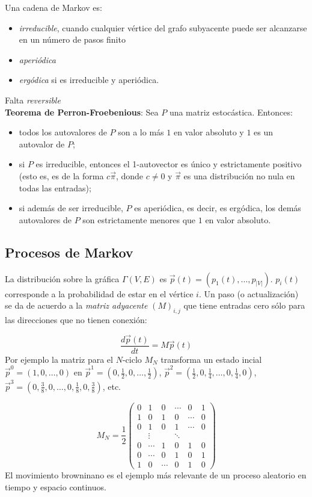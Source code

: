 \noindent Una cadena de Markov es:
\begin{itemize}
    \item \textit{irreducible}, cuando cualquier vértice del grafo subyacente puede ser alcanzarse en un número de pasos finito
    \item \textit{aperiódica}
    \item \textit{ergódica} si es irreducible y aperiódica.
\end{itemize}
Falta \textit{reversible}\\
\textbf{Teorema de Perron-Froebenious}: Sea $P$ una matriz estocástica. Entonces:
\begin{itemize}
    \item todos los autovalores de $P$ son a lo más $1$ en valor absoluto y $1$ es un autovalor de $P$;
    \item si $P$ es irreducible, entonces el 1-autovector es único y estrictamente positivo (esto es, es de la forma $c\vec{\pi}$, donde $c\neq 0$ y $\vec{\pi}$ es una distribución no nula en todas las entradas);
    \item si además de ser irreducible, $P$ es aperiódica, es decir, es ergódica, los demás autovalores de $P$ son estrictamente menores que $1$ en valor absoluto.
\end{itemize}

\subsection{Procesos de Markov\label{ProcesosMarkov}}
La distribución sobre la gráfica $\Gamma(V,E)$ es $\Vec{p}(t)=(p_1(t),\dots,p_{|V|})$. $p_i(t)$ corresponde a la probabilidad de estar en el vértice $i$. Un paso (o actualización) se da de acuerdo a la \textit{matriz adyacente} $(M)_{i,j}$ que tiene entradas cero sólo para las direcciones que no tienen conexión:

\begin{equation}
    \dfrac{d\Vec{p}(t)}{dt}=M\Vec{p}(t)
\end{equation}{}
Por ejemplo la matriz para el $N$-ciclo $M_N$ transforma un estado incial $\Vec{p}^0=(1,0,\dots,0)$ en $\Vec{p}^1=(0,\frac{1}{2},0,\dots,\frac{1}{2})$, $\Vec{p}^2=(\frac{1}{2},0,\frac{1}{4},\dots,0,\frac{1}{4},0)$, $\Vec{p}^3=(0,\frac{3}{8},0,\dots,0,\frac{1}{8},0,\frac{3}{8})$, etc.

\begin{equation*}
    M_N=\dfrac{1}{2}
    \begin{pmatrix}
    0& 1& 0& \cdots& 0 &1 \\
    1& 0& 1& 0& \cdots& 0\\
    0& 1& 0& 1& \cdots& 0\\
    &\vdots & &\ddots & & \\
    0& \cdots & 1 &0 &1 &0 \\
    0& \cdots&0 &1 &0 &1 \\
    1& 0& \cdots&0 &1 &0
    \end{pmatrix}{}
\end{equation*}{}
El movimiento browninano es el ejemplo más relevante de un proceso aleatorio en tiempo y espacio continuos.

